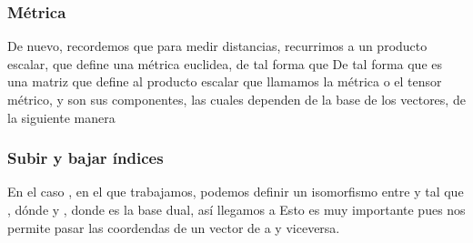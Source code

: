 \subsubsection{Métrica}
De nuevo, recordemos que para medir distancias, recurrimos a un producto escalar, que define una métrica euclidea, de tal forma que
De tal forma que  es una matriz que define al producto escalar que llamamos la métrica o el tensor métrico, y  son sus componentes, las cuales dependen de la base de los vectores, de la siguiente manera
\vspace{-35pt}
\subsubsection{Subir y bajar índices}
En el caso \lrg{$\R$}, en el que trabajamos, podemos definir un isomorfismo entre  y  tal que , dónde  y , donde  es la base dual, así llegamos a
Esto es muy importante pues nos permite pasar las coordendas de un vector de  a  y viceversa.
